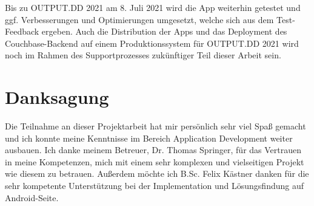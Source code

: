 \noindent Bis zu OUTPUT.DD 2021 am 8. Juli 2021 wird die App weiterhin getestet und ggf. Verbesserungen und Optimierungen umgesetzt, welche sich aus dem Test-Feedback ergeben. Auch die Distribution der Apps und das Deployment des Couchbase-Backend auf einem Produktionssystem für OUTPUT.DD 2021 wird noch im Rahmen des Supportprozesses zukünftiger Teil dieser Arbeit sein.

\section{Danksagung}

Die Teilnahme an dieser Projektarbeit hat mir persönlich sehr viel Spaß gemacht und ich konnte meine Kenntnisse im Bereich Application Development weiter ausbauen. Ich danke meinem Betreuer, Dr. Thomas Springer, für das Vertrauen in meine Kompetenzen, mich mit einem sehr komplexen und vielseitigen Projekt wie diesem zu betrauen. Außerdem möchte ich B.Sc. Felix Kästner danken für die sehr kompetente Unterstützung bei der Implementation und Lösungsfindung auf Android-Seite.
